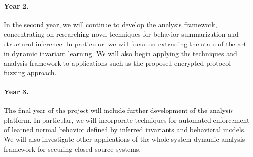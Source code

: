 \documentclass[letterpaper,twoside,11pt,headings=small]{scrartcl}
\begin{document}
\paragraph{Year 2.} In the second year, we will continue to develop the
analysis framework, concentrating on researching novel techniques for behavior
summarization and structural inference.  In particular, we will focus on
extending the state of the art in dynamic invariant learning.  We will also
begin applying the techniques and analysis framework to applications such
as the proposed encrypted protocol fuzzing approach.

\paragraph{Year 3.} The final year of the project will include further
development of the analysis platform.  In particular, we will incorporate
techniques for automated enforcement of learned normal behavior defined by
inferred invariants and behavioral models.  We will also investigate other
applications of the whole-system dynamic analysis framework for securing
closed-source systems.


\newpage
{}
\setcounter{page}{1}
\setcounter{section}{0}



\end{document}
